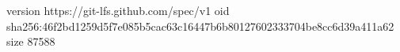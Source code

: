 version https://git-lfs.github.com/spec/v1
oid sha256:46f2bd1259d5f7e085b5cac63c16447b6b80127602333704be8cc6d39a411a62
size 87588
